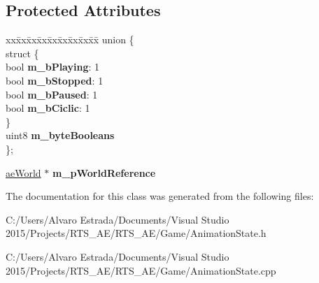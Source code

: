 \subsection*{Protected Attributes}
\begin{DoxyCompactItemize}
\item 
\begin{tabbing}
xx\=xx\=xx\=xx\=xx\=xx\=xx\=xx\=xx\=\kill
union \{\\
\>struct \{\\
\>\>bool {\bfseries m\_bPlaying}: 1\\
\>\>bool {\bfseries m\_bStopped}: 1\\
\>\>bool {\bfseries m\_bPaused}: 1\\
\>\>bool {\bfseries m\_bCiclic}: 1\\
\>\} \hypertarget{union_c_animation_state_1_1_0D38_af9375fe96e6af426dc09a76be22b1598}{}\label{union_c_animation_state_1_1_0D38_af9375fe96e6af426dc09a76be22b1598}
\\
\>uint8 {\bfseries m\_byteBooleans}\\
\}; \hypertarget{class_c_animation_state_a208eb30915b0beb4ec4322de36fc6b00}{}\label{class_c_animation_state_a208eb30915b0beb4ec4322de36fc6b00}
\\

\end{tabbing}\item 
\hyperlink{classae_world}{ae\+World} $\ast$ {\bfseries m\+\_\+p\+World\+Reference}\hypertarget{class_c_animation_state_aae2eaab07301fba6a3e8e441b5ccc905}{}\label{class_c_animation_state_aae2eaab07301fba6a3e8e441b5ccc905}

\end{DoxyCompactItemize}


The documentation for this class was generated from the following files\+:\begin{DoxyCompactItemize}
\item 
C\+:/\+Users/\+Alvaro Estrada/\+Documents/\+Visual Studio 2015/\+Projects/\+R\+T\+S\+\_\+\+A\+E/\+R\+T\+S\+\_\+\+A\+E/\+Game/Animation\+State.\+h\item 
C\+:/\+Users/\+Alvaro Estrada/\+Documents/\+Visual Studio 2015/\+Projects/\+R\+T\+S\+\_\+\+A\+E/\+R\+T\+S\+\_\+\+A\+E/\+Game/Animation\+State.\+cpp\end{DoxyCompactItemize}
